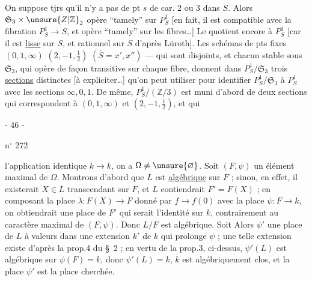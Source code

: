 
On suppose tjrs qu'il n'y a pas de pt $s$ de car. 2 ou 3 dans $S$. Alors  $\mathfrak S_3\times \unsure{Z|\mathbb Z}_2$ opère ``tamely'' sur $P^1_S$ [en fait, il est compatible avec la fibration $P^1_S\to S$, et opère ``tamely'' sur les fibres\ldots] Le quotient    encore à $P^1_S$ [car il est \uline{lisse} sur $S$, et rationnel sur $S$ d'après Lüroth]. Les schémas de pts fixes $(0,1,\infty)$ $(2,-1,\tfrac12)$ $(\bar S=x',x'')$ --- qui sont disjoints, et chacun stable sous $\mathfrak S_3$, qui   opère de façon  transitive sur chaque fibre, donnent dans $P^1_S/\mathfrak S_3$ trois \uline{sections} distinctes [à expliciter\ldots] qu'on peut utiliser pour identifier $P^1_S/\mathfrak S_3$ à $P^1_S$ avec les sections $\infty,0,1$. De même,  $P^1_S/(\mathbb Z/3)$ est muni d'abord de deux sections qui correspondent à $(0,1,\infty)$ et $(2,-1,\tfrac12)$, et qui

\begin{center}- 46 -\end{center}
\hfill n$^\circ$ 272

l'application identique $k\longrightarrow k$, on a $\Omega\ne\unsure{\varnothing}$. Soit $(F,\psi)$ un élément maximal de $\Omega$. Montrons d'abord que $L$ est \uline{algébrique} sur $F$ ; sinon, en effet, il existerait $X\in L$ transcendant sur $F$, et $L$ contiendrait $F'=F(X)$ ; en composant la place $\lambda:F(X)\longrightarrow F$ donné par $f\longrightarrow f(0)$ avec la place $\psi:F\longrightarrow k$, on obtiendrait une place de $F'$ qui serait l'identité sur $k$, contrairement au caractère maximal de $(F,\psi)$. Donc $L/F$ est algébrique. Soit Alors $\psi'$ une place de $L$ à valeurs dans une extension $k'$ de $k$ qui prolonge $\psi$ ; une telle extension existe d'après la prop.4 du \S\ 2 ; en vertu de la prop.3, ci-dessus, $\psi'(L)$ est algébrique sur $\psi(F)=k$, donc $\psi'(L)=k$,  $k$ est algébriquement clos, et la place $\psi'$ est la place cherchée.

